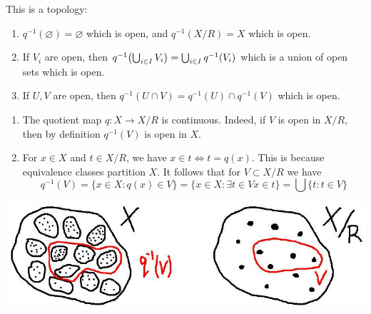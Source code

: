 \documentclass[a4paper]{article}
\begin{document}
This is a topology:
\begin{enumerate}
    \item \( q^{-1}(\varnothing) = \varnothing \) which is open, and \( q^{-1}(X/R) = X \) which is open.
    \item If \( V_i \) are open, then \( q^{-1}\qty(\bigcup_{i \in I} V_i) = \bigcup_{i \in I} q^{-1}(V_i) \) which is a union of open sets which is open.
    \item If \( U, V \) are open, then \( q^{-1}(U \cap V) = q^{-1}(U) \cap q^{-1}(V) \) which is open.
\end{enumerate}
\begin{remark}
    \begin{enumerate}
        \item The quotient map $q: X \rightarrow X / R$ is continuous. Indeed, if $V$ is open in $X / R$, then by definition $q^{-1}(V)$ is open in $X$.
      
        \item For $x \in X$ and $t \in X / R$, we have $x \in t \Longleftrightarrow t=q(x)$. This is because equivalence classes partition $X$. It follows that for $V \subset X / R$ we have
        $$
        q^{-1}(V)=\{x \in X: q(x) \in V\}=\{x \in X: \exists t \in V x \in t\}=\bigcup\{t: t \in V\}
        $$
      \end{enumerate}
\end{remark}
\begin{center}
    \includegraphics[scale=0.4]{at3.jpg}
\end{center}
\end{document}
